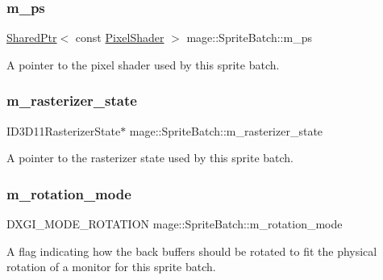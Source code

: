 \subsubsection{\texorpdfstring{m\+\_\+ps}{m\_ps}}
{\footnotesize\ttfamily \hyperlink{namespacemage_a1e01ae66713838a7a67d30e44c67703e}{Shared\+Ptr}$<$ const \hyperlink{namespacemage_ac98506b7edd999ea43ec46fbd0330238}{Pixel\+Shader} $>$ mage\+::\+Sprite\+Batch\+::m\+\_\+ps\hspace{0.3cm}{\ttfamily [private]}}

A pointer to the pixel shader used by this sprite batch. \hypertarget{classmage_1_1_sprite_batch_aab9307fdb565a263ecca709b22421a9f}{}\label{classmage_1_1_sprite_batch_aab9307fdb565a263ecca709b22421a9f} 
\subsubsection{\texorpdfstring{m\+\_\+rasterizer\+\_\+state}{m\_rasterizer\_state}}
{\footnotesize\ttfamily I\+D3\+D11\+Rasterizer\+State$\ast$ mage\+::\+Sprite\+Batch\+::m\+\_\+rasterizer\+\_\+state\hspace{0.3cm}{\ttfamily [private]}}

A pointer to the rasterizer state used by this sprite batch. \hypertarget{classmage_1_1_sprite_batch_ae062f178efe4a3af9c1573f8f8c4deee}{}\label{classmage_1_1_sprite_batch_ae062f178efe4a3af9c1573f8f8c4deee} 
\subsubsection{\texorpdfstring{m\+\_\+rotation\+\_\+mode}{m\_rotation\_mode}}
{\footnotesize\ttfamily D\+X\+G\+I\+\_\+\+M\+O\+D\+E\+\_\+\+R\+O\+T\+A\+T\+I\+ON mage\+::\+Sprite\+Batch\+::m\+\_\+rotation\+\_\+mode\hspace{0.3cm}{\ttfamily [private]}}

A flag indicating how the back buffers should be rotated to fit the physical rotation of a monitor for this sprite batch. \hypertarget{classmage_1_1_sprite_batch_acb0e0af87377a714f37cdc3a66532c9b}{}\label{classmage_1_1_sprite_batch_acb0e0af87377a714f37cdc3a66532c9b} 
